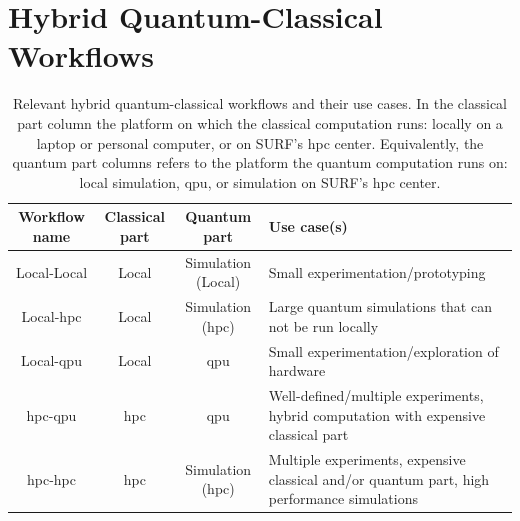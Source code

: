 \section{Hybrid Quantum-Classical Workflows}
\begin{table}[ht]
    \centering
    {\renewcommand{\arraystretch}{1.35}
        \begin{tabular}{ c|c|c|>{\centering\arraybackslash}m{4.9cm} }
            Workflow name & Classical part & Quantum part & Use case(s) \\
            \hline
            Local-Local & Local & Simulation (Local) & Small experimentation/prototyping \\
            \hline
            Local-\gls{hpc} & Local & Simulation (\gls{hpc}) & Large quantum simulations that can not be run locally \\
            \hline
            Local-\gls{qpu} & Local & \gls{qpu} & Small experimentation/exploration of hardware \\
            \hline
            \gls{hpc}-\gls{qpu} & \gls{hpc} & \gls{qpu} & Well-defined/multiple experiments, hybrid computation with expensive classical part \\
            \hline
            \gls{hpc}-\gls{hpc} & \gls{hpc} & Simulation (\gls{hpc}) & Multiple experiments, expensive classical and/or quantum part, high performance simulations \\
        \end{tabular}
    }
    \caption[Relevant hybrid quantum-classical workflows and their use cases.]{
        Relevant hybrid quantum-classical workflows and their use cases.
        In the classical part column the platform on which the classical computation runs: locally on a laptop or personal computer, or on SURF's \gls{hpc} center.
        Equivalently, the quantum part columns refers to the platform the quantum computation runs on: local simulation, \gls{qpu}, or simulation on SURF's \gls{hpc} center.
    }
    \label{table:hqca-workflows}
\end{table}
